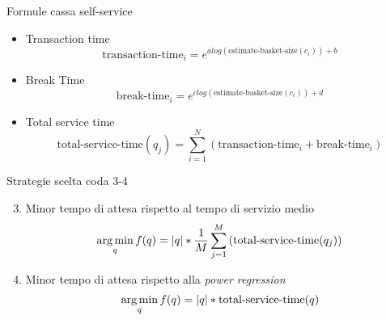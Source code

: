 \begin{frame}{Formule cassa self-service}
  \begin{itemize}
  \item Transaction time
    \begin{equation}
      \text{transaction-time}_i = e^{a log(\text{estimate-basket-size}(c_i)) + b}
\end{equation}
    
\item Break Time
  \begin{equation}
    \text{break-time}_i = e^{c log(\text{estimate-basket-size}(c_i)) + d}
  \end{equation}
\item Total service time
  \begin{equation}
    \text{total-service-time}(q_j) = \sum\limits_{i=1}^N \left( \text{transaction-time}_i + \text{break-time}_i \right)
  \end{equation}  
\end{itemize}  
\end{frame}

\begin{frame}{Strategie scelta coda 3-4}
  \begin{enumerate}
    \setcounter{enumi}{2}
  \item Minor tempo di attesa rispetto al tempo di servizio medio
    \begin{equation}
      \operatorname*{arg\,min}_q f(q) = |q| * \frac{1}{M}\sum\limits_{j=1}^M \left( \text{total-service-time}(q_j) \right)
\end{equation}
\item Minor tempo di attesa rispetto alla \textit{power regression}
  \begin{equation}
    \operatorname*{arg\,min}_q f(q) = |q| * \text{total-service-time}(q)
  \end{equation}
\end{enumerate}
\end{frame}


